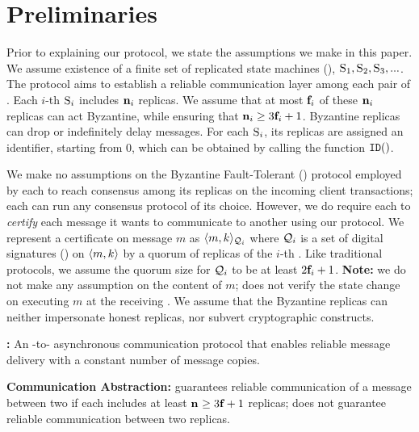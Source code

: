 \section{Preliminaries}
Prior to explaining our \Scrooge{} protocol, we state the assumptions we make 
in this paper.
We assume existence of a finite set of replicated state machines (\RSM{}), 
$\textsc{S}_{1}, \textsc{S}_{2}, \textsc{S}_{3}, ...$.
The \Scrooge{} protocol aims to establish a reliable communication layer among each pair 
of .
Each $i$-th \RSM{} $\textsc{S}_{i}$ includes $\textbf{n}_{i}$ replicas. 
We assume that at most $\textbf{f}_{i}$ of these $\textbf{n}_{i}$ replicas can act Byzantine, while ensuring 
that $\textbf{n}_{i} \ge 3\textbf{f}_{i} + 1$.
Byzantine replicas can drop or indefinitely delay messages.
For each \RSM{} $\textsc{S}_{i}$, its replicas are assigned an identifier, starting from $0$, 
which can be obtained by calling the function $\texttt{ID}({})$.


We make no assumptions on the Byzantine Fault-Tolerant (\BFT{}) protocol employed by each \RSM{} 
to reach consensus among its replicas on the incoming client transactions; 
each \RSM{} can run any \BFT{} consensus protocol of its choice.
However, we do require each \RSM{} to {\em certify} each message it wants to communicate 
to another \RSM{} using our \Scrooge{} protocol.
We represent a certificate on message $m$ as $\langle m, k\rangle_{\mathcal{Q}_{i}}$ where
$\mathcal{Q}_{i}$ is a set of digital signatures (\DS{}) on $\langle m, k \rangle$ by a quorum of replicas 
of the $i$-th \RSM{}.
Like traditional \BFT{} protocols, we assume the quorum size for $\mathcal{Q}_{i}$ to be at least $2\textbf{f}_{i}+1$.
{\bf Note:} we do not make any assumption on the content of $m$; 
\Scrooge{} does not verify the state change on executing $m$ at the receiving \RSM{}.
We assume that the Byzantine replicas can neither impersonate honest replicas, nor subvert cryptographic constructs.


\begin{definition}
{\bf \Scrooge{}:}
An \RSM{}-to-\RSM{} asynchronous communication protocol that enables reliable message delivery with a constant 
number of message copies.
\end{definition}

\begin{definition}
{\bf Communication Abstraction:}
\Scrooge{} guarantees reliable communication of a message between two  if each \RSM{} includes at least $\textbf{n}_{} \ge 3\textbf{f}_{}+1$ 
replicas;
\Scrooge{} does not guarantee reliable communication between two replicas.
\end{definition}


